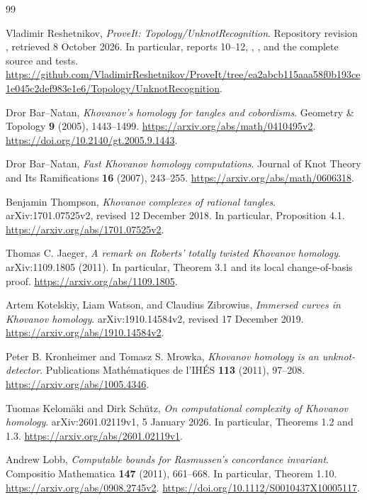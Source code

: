 \begin{thebibliography}{99}
\raggedright

Vladimir Reshetnikov, \emph{ProveIt: Topology/UnknotRecognition}.
Repository revision
,
retrieved 8 October 2026. In particular, reports 10--12,
, ,
and the complete  source and tests.
\url{https://github.com/VladimirReshetnikov/ProveIt/tree/ea2abcb115aaa58f0b193ce1e045c2def983e1e6/Topology/UnknotRecognition}.

Dror Bar--Natan, \emph{Khovanov's homology for tangles and cobordisms}.
Geometry \& Topology \textbf{9} (2005), 1443--1499.
\url{https://arxiv.org/abs/math/0410495v2}.
\url{https://doi.org/10.2140/gt.2005.9.1443}.

Dror Bar--Natan, \emph{Fast Khovanov homology computations}.
Journal of Knot Theory and Its Ramifications \textbf{16} (2007),
243--255.
\url{https://arxiv.org/abs/math/0606318}.

Benjamin Thompson, \emph{Khovanov complexes of rational tangles}.
arXiv:1701.07525v2, revised 12 December 2018.
In particular, Proposition 4.1.
\url{https://arxiv.org/abs/1701.07525v2}.

Thomas C. Jaeger, \emph{A remark on Roberts' totally twisted Khovanov
homology}. arXiv:1109.1805 (2011).
In particular, Theorem 3.1 and its local change-of-basis proof.
\url{https://arxiv.org/abs/1109.1805}.

Artem Kotelskiy, Liam Watson, and Claudius Zibrowius,
\emph{Immersed curves in Khovanov homology}.
arXiv:1910.14584v2, revised 17 December 2019.
\url{https://arxiv.org/abs/1910.14584v2}.

Peter B. Kronheimer and Tomasz S. Mrowka,
\emph{Khovanov homology is an unknot-detector}.
Publications Math\'ematiques de l'IH\'ES \textbf{113} (2011), 97--208.
\url{https://arxiv.org/abs/1005.4346}.

Tuomas Kelom\"aki and Dirk Sch\"utz,
\emph{On computational complexity of Khovanov homology}.
arXiv:2601.02119v1, 5 January 2026.
In particular, Theorems 1.2 and 1.3.
\url{https://arxiv.org/abs/2601.02119v1}.

Andrew Lobb, \emph{Computable bounds for Rasmussen's concordance
invariant}. Compositio Mathematica \textbf{147} (2011), 661--668.
In particular, Theorem 1.10.
\url{https://arxiv.org/abs/0908.2745v2}.
\url{https://doi.org/10.1112/S0010437X10005117}.


\end{thebibliography}

